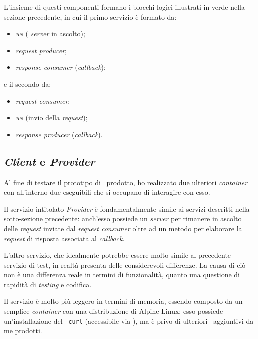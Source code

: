 \noindent
L'insieme di questi componenti formano i blocchi logici illustrati in verde nella sezione precedente, in cui il primo servizio è formato da:
\begin{itemize}
  \item {} \textit{\acrlong{ws}} ( \textit{server} in ascolto);
  \item \textit{request producer};
  \item \textit{response consumer} (\textit{callback});
\end{itemize}
\noindent
e il secondo da:
\begin{itemize}
  \item \textit{request consumer};
  \item {} \textit{\acrlong{ws}} (invio della \textit{request});
  \item \textit{response producer} (\textit{callback}).
\end{itemize}

\subsection{ \textit{Client} e  \textit{Provider} }

Al fine di testare il prototipo di \middleware\ prodotto, ho realizzato due ulteriori \textit{container} con all'interno due eseguibili che si occupano di interagire con esso.

Il servizio intitolato  \textit{Provider} è fondamentalmente simile ai servizi descritti nella sotto-sezione precedente: anch'esso possiede un  \textit{server} per rimanere in ascolto delle  \textit{request} inviate dal \textit{request consumer} oltre ad un metodo per elaborare la  \textit{request} di risposta associata al \textit{callback}.

L'altro servizio, che idealmente potrebbe essere molto simile al precedente servizio di test, in realtà presenta delle considerevoli differenze.
La causa di ciò non è una differenza reale in termini di funzionalità, quanto una questione di rapidità di \textit{testing} e codifica.

Il servizio è molto più leggero in termini di memoria, essendo composto da un semplice \textit{container} con una distribuzione di Alpine Linux; esso possiede un'installazione del \software\ \texttt{curl} (accessibile via ), ma è privo di ulteriori \software\ aggiuntivi da me prodotti.

